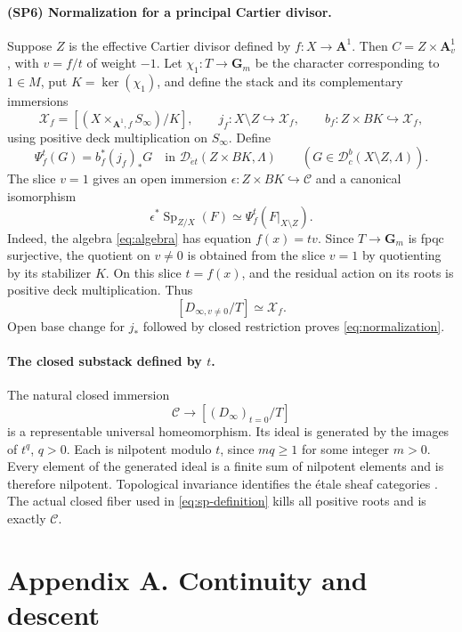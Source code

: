 \documentclass[11pt,a4paper]{article}
\newcommand{\A}{\mathbf A}
\newcommand{\Gm}{\mathbf G_m}
\newcommand{\Sp}{\operatorname{Sp}}
\newcommand{\Det}{\mathcal D_{\acute et}}
\newcommand{\Dc}{\mathcal D^b_c}
\newcommand{\cC}{\mathscr C}
\theoremstyle{notes}
\renewcommand{\theequation}{8.\arabic{equation}}
\renewcommand{\theHequation}{8.\arabic{equation}}
\begin{document}
\paragraph{(SP6) Normalization for a principal Cartier divisor.}
Suppose $Z$ is the effective Cartier divisor defined by $f:X\to\A^1$. Then $C=Z\times\A^1_v$, with $v=f/t$ of weight $-1$. Let $\chi_1:T\to\Gm$ be the character corresponding to $1\in M$, put $K=\ker(\chi_1)$, and define the stack and its complementary immersions
\[
\mathscr X_f=[(X\times_{\A^1,f}S_\infty)/K],\qquad
j_f:X\setminus Z\hookrightarrow\mathscr X_f,\qquad
b_f:Z\times BK\hookrightarrow\mathscr X_f,
\]
using positive deck multiplication on $S_\infty$. Define
\[
\Psi_f^t(G)=b_f^*(j_f)_*G\quad\text{in }\Det(Z\times BK,\Lambda)
\qquad(G\in\Dc(X\setminus Z,\Lambda)).
\]
The slice $v=1$ gives an open immersion $\epsilon:Z\times BK\hookrightarrow\cC$ and a canonical isomorphism
\begin{equation}\label{eq:normalization}
\epsilon^*\Sp_{Z/X}(F)\simeq\Psi_f^t(F|_{X\setminus Z}).
\end{equation}
Indeed, the algebra \eqref{eq:algebra} has equation $f(x)=tv$. Since $T\to\Gm$ is fpqc surjective, the quotient on $v\ne0$ is obtained from the slice $v=1$ by quotienting by its stabilizer $K$. On this slice $t=f(x)$, and the residual action on its roots is positive deck multiplication. Thus
\[
[D_{\infty,v\ne0}/T]\simeq\mathscr X_f.
\]
Open base change for $j_*$ followed by closed restriction proves \eqref{eq:normalization}.

\paragraph{The closed substack defined by $t$.}
The natural closed immersion
\[
\cC\longrightarrow[(D_\infty)_{t=0}/T]
\]
is a representable universal homeomorphism. Its ideal is generated by the images of $t^q$, $q>0$. Each is nilpotent modulo $t$, since $mq\geq1$ for some integer $m>0$. Every element of the generated ideal is a finite sum of nilpotent elements and is therefore nilpotent. Topological invariance identifies the étale sheaf categories \cite[Tag 04DZ]{Stacks}. The actual closed fiber used in \eqref{eq:sp-definition} kills all positive roots and is exactly $\cC$.

\section*{Appendix A. Continuity and descent}
\renewcommand{\theequation}{A.\arabic{equation}}
\renewcommand{\theHequation}{A.\arabic{equation}}\setcounter{equation}{0}
\end{document}
